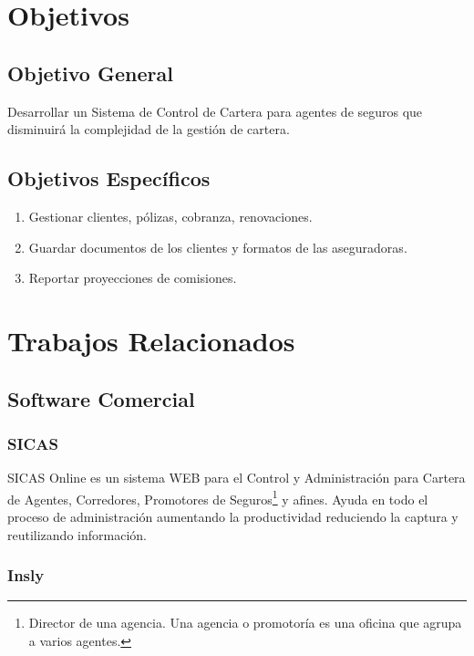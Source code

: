 \section{Objetivos}
\subsection*{Objetivo General}
Desarrollar un Sistema de Control de Cartera para agentes de seguros que disminuirá la complejidad de la gestión de cartera.
\subsection*{Objetivos Específicos}
\begin{enumerate}
	\item Gestionar clientes, pólizas, cobranza, renovaciones.
	\item Guardar documentos de los clientes y formatos de las aseguradoras.
	\item Reportar proyecciones de comisiones.
\end{enumerate}

\section{Trabajos Relacionados}
\subsection*{Software Comercial}
\subsubsection*{SICAS \cite{www:sicas}} 

SICAS Online es un sistema WEB para el Control y Administración para Cartera de Agentes, Corredores, Promotores de Seguros\footnote{Director de una agencia. Una agencia o promotor\'ia es una oficina que agrupa a varios agentes.} y afines. Ayuda en todo el proceso de administración aumentando la productividad reduciendo la captura y reutilizando información.

\subsubsection*{Insly \cite{www:insly}}

